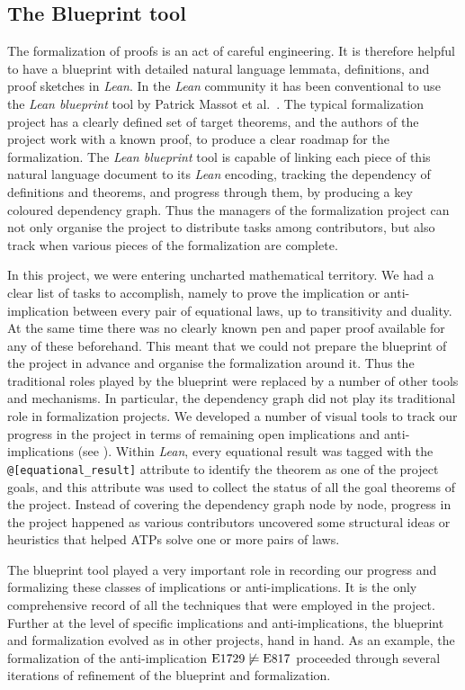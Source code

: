 \subsection{The Blueprint tool}

The formalization of proofs is an act of careful engineering. It is therefore helpful to  have a blueprint with detailed natural language lemmata, definitions, and proof sketches in \emph{Lean}. In the \emph{Lean} community it has been conventional to use the  \emph{Lean blueprint} tool by Patrick Massot et al.~\cite{GitHubGitHubPatrickMassotleanblueprint}. The typical formalization project has a clearly defined set of target theorems, and the authors of the project work with a known proof, to produce a clear roadmap for the formalization. The \emph{Lean blueprint} tool is capable of linking each piece of this natural language document to its \emph{Lean} encoding, tracking the dependency of definitions and theorems, and progress through them, by producing a key coloured dependency graph. Thus the managers of the formalization project can not only organise the project to distribute tasks among contributors, but also track when various pieces of the formalization are complete.

In this project, we were entering uncharted mathematical territory. We had a clear list of tasks to accomplish, namely to prove the implication or anti-implication between every pair of equational laws, up to transitivity and duality. At the same time there was no clearly known pen and paper proof available for any of these beforehand. This meant that we could not prepare the blueprint of the project in advance and organise the formalization around it. Thus the traditional roles played by the blueprint were replaced by a number of other tools and mechanisms. In particular, the dependency graph did not play its traditional role in formalization projects. We developed a number of visual tools to track our progress in the project  in terms of remaining open implications and anti-implications (see ). Within \emph{Lean}, every equational result was tagged with the \texttt{@[equational\_result]} attribute to identify the theorem as one of the project goals, and this attribute was used to collect the status of all the goal theorems of the project. Instead of covering the dependency graph node by node, progress in the project happened as various contributors uncovered some structural ideas or heuristics that helped ATPs solve one or more pairs of laws.

The blueprint tool played a very important role in recording our progress and formalizing these classes of implications or anti-implications. It is the only comprehensive record of all the techniques that were employed in the project. Further at the level of specific implications and anti-implications, the blueprint and formalization evolved as in other projects, hand in hand. As an example, the formalization of the anti-implication  $\mathrm{E}1729 \not\models \mathrm{E}817$ proceeded through several iterations of refinement of the blueprint and formalization.

